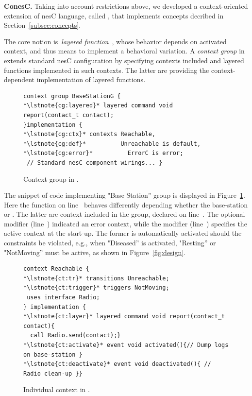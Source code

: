 {\bfseries ConesC.} Taking into account restrictions above, we developed a
context-oriented extension of nesC language, called \conesc, that implements
concepts decribed in Section~\ref{subsec:concepts}.

The core notion is~\emph{layered function}~\cite{Hirschfeld08}, whose behavior
depends on activated context, and thus means to implement a behavioral
variation. A \emph{context group} in \conesc extends standard nesC configuration
by specifying contexts included and layered functions implemented in such
contexts. The latter are providing the context-dependent implementation of
layered functions.

\begin{figure}[!tb]
\begin{lstlisting}[style=conescframe]
context group BaseStationG {
*\lstnote{cg:layered}* layered command void report(contact_t contact);
}implementation {
*\lstnote{cg:ctx}* contexts Reachable, 
*\lstnote{cg:def}*          Unreachable is default,
*\lstnote{cg:error}*          ErrorC is error;
 // Standard nesC component wirings... }
\end{lstlisting}
\vspace{-5mm}
\caption{Context group in \conesc.}
  \label{fig:configuration}
\vspace{-3mm}
\end{figure}

The snippet of \conesc code implementing "Base Station'' group is displayed in
Figure~\ref{fig:configuration}. Here the function  on
line~ behaves differently depending whether the base-station
 or . The latter are context included in the
group, declared on line~. The optional modifier 
(line~) indicated an error context, while the modifier  (line~) specifies the active context at the start-up.
The former is automatically activated should the constraints be violated, e.g.,
when "Diseased'' is activated, "Resting'' or "NotMoving'' must be active, as
shown in Figure~\ref{fig:design}.

\begin{figure}[!tb]
\begin{lstlisting}[style=conescframe]
context Reachable {
*\lstnote{ct:tr}* transitions Unreachable;
*\lstnote{ct:trigger}* triggers NotMoving;
 uses interface Radio;
} implementation {
*\lstnote{ct:layer}* layered command void report(contact_t contact){
  call Radio.send(contact);}
*\lstnote{ct:activate}* event void activated(){// Dump logs on base-station }
*\lstnote{ct:deactivate}* event void deactivated(){ // Radio clean-up }}
\end{lstlisting}
\vspace{-5mm}
\caption{Individual context in \conesc.}
  \label{fig:context}
\vspace{-5mm}
\end{figure}

